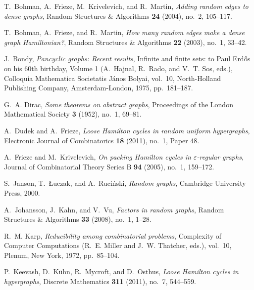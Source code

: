 \documentclass[11pt,english]{article}
\theoremstyle{plain}
\theoremstyle{definition}
\theoremstyle{definition}
\theoremstyle{plain}
\theoremstyle{plain}
\theoremstyle{plain}
\theoremstyle{plain}
\theoremstyle{remark}
\theoremstyle{remark}
\begin{document}

\providecommand{\bysame}{\leavevmode\hbox to3em{\hrulefill}\thinspace}
\providecommand{\MR}{\relax\ifhmode\unskip\space\fi MR }
\providecommand{\MRhref}[2]{%
  \href{http://www.ams.org/mathscinet-getitem?mr=#1}{#2}
}
\providecommand{\href}[2]{#2}
\begin{thebibliography}{10}

T.~Bohman, A.~Frieze, M.~Krivelevich, and R.~Martin, \emph{Adding random edges
  to dense graphs}, Random Structures \& Algorithms \textbf{24} (2004), no.~2,
  105--117.

T.~Bohman, A.~Frieze, and R.~Martin, \emph{How many random edges make a dense
  graph {H}amiltonian?}, Random Structures \& Algorithms \textbf{22} (2003),
  no.~1, 33--42.

J.~Bondy, \emph{Pancyclic graphs: Recent results}, Infinite and finite sets: to
  {P}aul {E}rd\H{o}s on his 60th birthday, Volume 1 (A.~Hajnal, R.~Rado, and
  V.~T. Sos, eds.), Colloquia Mathematica Societatis J\'anos Bolyai, vol.~10,
  North-Holland Publishing Company, Amsterdam-London, 1975, pp.~181--187.

G.~A. Dirac, \emph{Some theorems on abstract graphs}, Proceedings of the London
  Mathematical Society \textbf{3} (1952), no.~1, 69--81.

A.~Dudek and A.~Frieze, \emph{Loose {H}amilton cycles in random uniform
  hypergraphs}, Electronic Journal of Combinatorics \textbf{18} (2011), no.~1,
  Paper 48.

A.~Frieze and M.~Krivelevich, \emph{On packing {H}amilton cycles in
  $\varepsilon$-regular graphs}, Journal of Combinatorial Theory Series B
  \textbf{94} (2005), no.~1, 159--172.

S.~Janson, T.~{\L{}}uczak, and A.~Ruci{\'n}ski, \emph{Random graphs}, Cambridge
  University Press, 2000.

A.~Johansson, J.~Kahn, and V.~Vu, \emph{Factors in random graphs}, Random
  Structures \& Algorithms \textbf{33} (2008), no.~1, 1--28.

R.~M. Karp, \emph{Reducibility among combinatorial problems}, Complexity of
  Computer Computations (R.~E. Miller and J.~W. Thatcher, eds.), vol.~10,
  Plenum, New York, 1972, pp.~85--104.

P.~Keevash, D.~K{\"u}hn, R.~Mycroft, and D.~Osthus, \emph{Loose {H}amilton
  cycles in hypergraphs}, Discrete Mathematics \textbf{311} (2011), no.~7,
  544--559.


\end{thebibliography}
\end{document}
